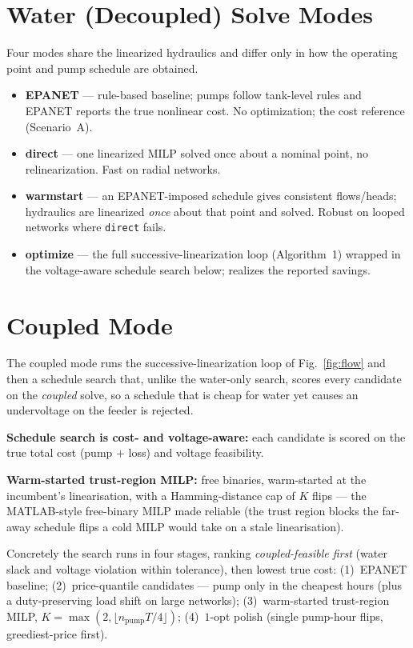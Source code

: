 \documentclass[9pt,twocolumn]{IEEEtran}
\newcommand{\pump}{\ensuremath{\mathrm{pump}}}
\newcommand{\code}[1]{\texttt{\scriptsize #1}}
\begin{document}
\section{Water (Decoupled) Solve Modes}
Four modes share the linearized hydraulics and differ only in how the operating point and pump
schedule are obtained.
\begin{itemize}
\item \textbf{EPANET} --- rule-based baseline; pumps follow tank-level rules and EPANET reports the
true nonlinear cost. No optimization; the cost reference (Scenario~A).
\item \textbf{direct} --- one linearized MILP solved once about a nominal point, no relinearization.
Fast on radial networks.
\item \textbf{warmstart} --- an EPANET-imposed schedule gives consistent flows/heads; hydraulics are
linearized \emph{once} about that point and solved. Robust on looped networks where \code{direct} fails.
\item \textbf{optimize} --- the full successive-linearization loop (Algorithm~1) wrapped in the
voltage-aware schedule search below; realizes the reported savings.
\end{itemize}

\section{Coupled Mode}
The coupled mode runs the successive-linearization loop of Fig.~\ref{fig:flow} and then a schedule
search that, unlike the water-only search, scores every candidate on the \emph{coupled} solve, so a
schedule that is cheap for water yet causes an undervoltage on the feeder is rejected.

\smallskip\noindent\textbf{Schedule search is cost- and voltage-aware:} each candidate is scored on
the true total cost (pump $+$ loss) and voltage feasibility.

\smallskip\noindent\textbf{Warm-started trust-region MILP:} free binaries, warm-started at the
incumbent's linearisation, with a Hamming-distance cap of $K$ flips --- the MATLAB-style free-binary
MILP made reliable (the trust region blocks the far-away schedule flips a cold MILP would take on a
stale linearisation).

\smallskip Concretely the search runs in four stages, ranking \emph{coupled-feasible first} (water
slack and voltage violation within tolerance), then lowest true cost: (1)~EPANET baseline;
(2)~price-quantile candidates --- pump only in the cheapest hours (plus a duty-preserving load shift
on large networks); (3)~warm-started trust-region MILP, $K=\max(2,\lfloor n_{\pump}T/4\rfloor)$;
(4)~$1$-opt polish (single pump-hour flips, greediest-price first).
\end{document}
